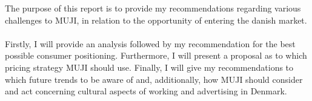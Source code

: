 The purpose of this report is to provide my recommendations regarding various challenges to MUJI, in relation to the opportunity of entering the danish market.
\\\\
Firstly, I will provide an analysis followed by my recommendation for the best possible consumer positioning. Furthermore, I will present a proposal as to which pricing strategy MUJI should use. Finally, I will give my recommendations to which future trends to be aware of and, additionally, how MUJI should consider and act concerning cultural aspects of working and advertising in Denmark. 